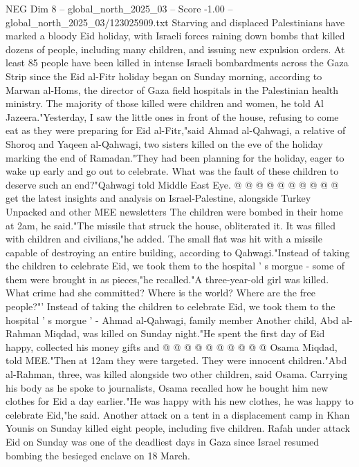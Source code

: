 \begin{textsample}{NEG Dim 8 – global\_north\_2025\_03 – Score -1.00 – global\_north\_2025\_03/123025909.txt}  \label{ex:f8_neg_126}
Starving and displaced Palestinians have marked a bloody Eid holiday, with Israeli forces raining down bombs that killed dozens of people, including many children, and issuing new expulsion orders.
At least 85 people have been killed in intense Israeli bombardments across the Gaza Strip since the Eid al-Fitr holiday began on Sunday morning, according to Marwan al-Homs, the director of Gaza field hospitals in the Palestinian health ministry.
The majority of those killed were children and women, he told Al Jazeera."Yesterday, I saw the little ones in front of the house, refusing to come eat as they were preparing for Eid al-Fitr,"said Ahmad al-Qahwagi, a relative of Shoroq and Yaqeen al-Qahwagi, two sisters killed on the eve of the holiday marking the end of Ramadan."They had been planning for the holiday, eager to wake up early and go out to celebrate.
What was the fault of these children to deserve such an end?"Qahwagi told Middle East Eye. @ @ @ @ @ @ @ @ @ @ get the latest insights and analysis on Israel-Palestine, alongside Turkey Unpacked and other MEE newsletters The children were bombed in their home at 2am, he said."The missile that struck the house, obliterated it.
It was filled with children and civilians,"he added.
The small flat was hit with a missile capable of destroying an entire building, according to Qahwagi."Instead of taking the children to celebrate Eid, we took them to the hospital ' s morgue - some of them were brought in as pieces,"he recalled."A three-year-old girl was killed.
What crime had she committed?
Where is the world?
Where are the free people?"' Instead of taking the children to celebrate Eid, we took them to the hospital ' s morgue ' - Ahmad al-Qahwagi, family member Another child, Abd al-Rahman Miqdad, was killed on Sunday night."He spent the first day of Eid happy, collected his money gifts and @ @ @ @ @ @ @ @ @ @ Osama Miqdad, told MEE."Then at 12am they were targeted.
They were innocent children."Abd al-Rahman, three, was killed alongside two other children, said Osama.
Carrying his body as he spoke to journalists, Osama recalled how he bought him new clothes for Eid a day earlier."He was happy with his new clothes, he was happy to celebrate Eid,"he said.
Another attack on a tent in a displacement camp in Khan Younis on Sunday killed eight people, including five children.
Rafah under attack Eid on Sunday was one of the deadliest days in Gaza since Israel resumed bombing the besieged enclave on 18 March.

\end{textsample}
